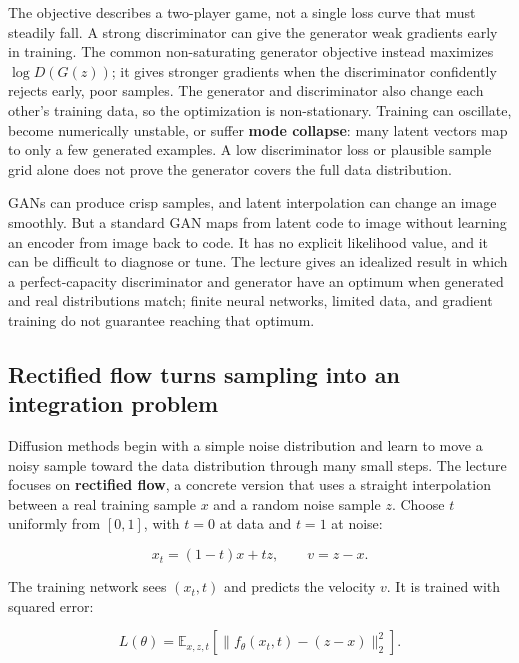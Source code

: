 The objective describes a two-player game, not a single loss curve that must steadily fall. A strong discriminator can give the generator weak gradients early in training. The common non-saturating generator objective instead maximizes \(\log D(G(z))\); it gives stronger gradients when the discriminator confidently rejects early, poor samples. The generator and discriminator also change each other's training data, so the optimization is non-stationary. Training can oscillate, become numerically unstable, or suffer \textbf{mode collapse}: many latent vectors map to only a few generated examples. A low discriminator loss or plausible sample grid alone does not prove the generator covers the full data distribution.

GANs can produce crisp samples, and latent interpolation can change an image smoothly. But a standard GAN maps from latent code to image without learning an encoder from image back to code. It has no explicit likelihood value, and it can be difficult to diagnose or tune. The lecture gives an idealized result in which a perfect-capacity discriminator and generator have an optimum when generated and real distributions match; finite neural networks, limited data, and gradient training do not guarantee reaching that optimum.

\subsection{Rectified flow turns sampling into an integration problem}\label{04-visual-computing-ii-ch031-rectified-flow-turns-sampling-into-an-integration-problem}

\hypertarget{04-visual-computing-ii-ch031-rectified-flow-turns-sampling-into-an-integration-problem}{}

Diffusion methods begin with a simple noise distribution and learn to move a noisy sample toward the data distribution through many small steps. The lecture focuses on \textbf{rectified flow}, a concrete version that uses a straight interpolation between a real training sample \(x\) and a random noise sample \(z\). Choose \(t\) uniformly from \([0,1]\), with \(t=0\) at data and \(t=1\) at noise:

\[
x_t=(1-t)x+t z,\qquad v=z-x.
\]

The training network sees \((x_t,t)\) and predicts the velocity \(v\). It is trained with squared error:

\[
L(\theta)=\mathbb{E}_{x,z,t}\left[\|f_\theta(x_t,t)-(z-x)\|_2^2\right].
\]

